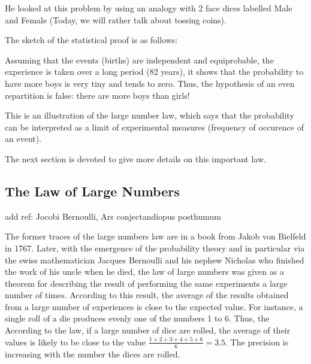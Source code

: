 He looked at this problem by using an analogy with 2 face dices labelled Male and Female
(Today, we will rather talk about tossing coins). 
\medskip

The sketch of the statistical proof is as follows:

Assuming that the events (births) are independent and equiprobable,
the experience is taken over a long period (82 years), it shows that the probability to have more boys is very tiny and
tends to zero. 
Thus, the hypothesis of an even repartition is false: there are more boys than girls!
\medskip

This is an illustration of the large number law, which says that the probability can be interpreted 
as a limit of experimental measures (frequency of occurence of an event). 
\bigskip

\noindent {}
\bigskip

The next section is devoted to give more details on this important law.


\subsection{The Law of Large Numbers} 

{\Denis add ref: Jocobi Bernoulli, Ars conjectandiopus posthumum}

The former traces of the large numbers law are in a book from Jakob von Bielfeld in 1767.
Later, with the emergence of the probability theory and in particular via the swiss mathematician Jacques Bernoulli
and his nephew Nicholas who finished the work of his uncle when he died, 
the law of large numbers was given as a theorem for describing the result of performing the same experiments
 a large number of times. 
 According to this result, the average of the results obtained from a large number of experiences is close 
 to the expected value. 
For instance, a single roll of a die produces evenly one of the numbers 1 to 6.
Thus, the According to the law, if a large number of dice are rolled, the average of their values 
is likely to be close to the value $\frac{1+2+3+4+5+6}{6}=3.5$.
The precision is increasing with the number the dices are rolled. 


